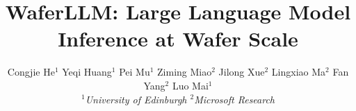 \documentclass[letterpaper,twocolumn,10pt]{article}
\begin{document}
\newcommand{\gemm}{MeshGEMM\xspace}
\newcommand{\gemv}{MeshGEMV\xspace}
\newcommand{\sys}{WaferLLM\xspace}



\title{\Large \bf \sys: Large Language Model Inference at Wafer Scale}
\date{}



\author{
{\rm Congjie He$^1$ \hspace{0.05cm} Yeqi Huang$^1$ \hspace{0.05cm} Pei Mu$^1$ \hspace{0.05cm} Ziming Miao$^2$ \hspace{0.05cm} Jilong Xue$^2$ \hspace{0.05cm} Lingxiao Ma$^2$ \hspace{0.05cm} Fan Yang$^2$ \hspace{0.05cm} Luo Mai$^1$} \\ \vspace{-0.1cm}
{\it $^1$University of Edinburgh \quad $^2$Microsoft Research \vspace{-0.5cm}}
}
\maketitle
\end{document}
